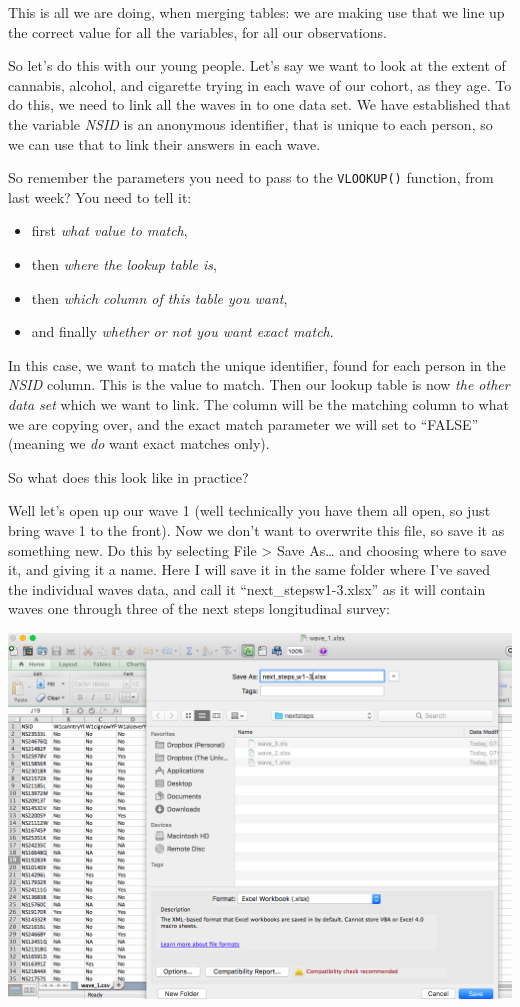 \documentclass[
]{book}
\providecommand{\tightlist}{%
  \setlength{\itemsep}{0pt}\setlength{\parskip}{0pt}}
\begin{document}
This is all we are doing, when merging tables: we are making use that we line up the correct value for all the variables, for all our observations.

So let's do this with our young people. Let's say we want to look at the extent of cannabis, alcohol, and cigarette trying in each wave of our cohort, as they age. To do this, we need to link all the waves in to one data set. We have established that the variable \emph{NSID} is an anonymous identifier, that is unique to each person, so we can use that to link their answers in each wave.

So remember the parameters you need to pass to the \texttt{VLOOKUP()} function, from last week? You need to tell it:

\begin{itemize}
\tightlist
\item
  first \emph{what value to match},
\item
  then \emph{where the lookup table is},
\item
  then \emph{which column of this table you want},
\item
  and finally \emph{whether or not you want exact match}.
\end{itemize}

In this case, we want to match the unique identifier, found for each person in the \emph{NSID} column. This is the value to match. Then our lookup table is now \emph{the other data set} which we want to link. The column will be the matching column to what we are copying over, and the exact match parameter we will set to ``FALSE'' (meaning we \emph{do} want exact matches only).

So what does this look like in practice?

Well let's open up our wave 1 (well technically you have them all open, so just bring wave 1 to the front). Now we don't want to overwrite this file, so save it as something new. Do this by selecting File \textgreater{} Save As\ldots{} and choosing where to save it, and giving it a name. Here I will save it in the same folder where I've saved the individual waves data, and call it ``next\_stepsw1-3.xlsx'' as it will contain waves one through three of the next steps longitudinal survey:

\includegraphics{imgs/rename.png}
\end{document}
